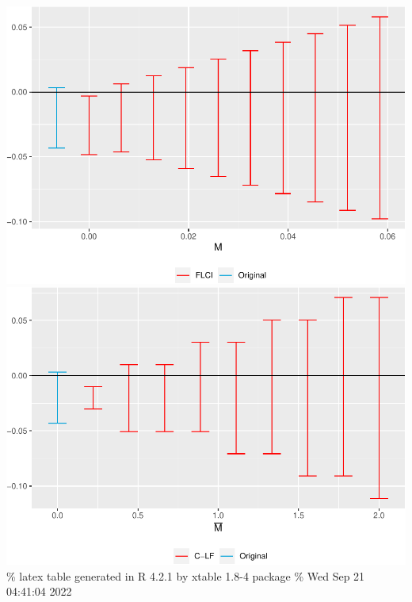 \documentclass[
]{article}
\begin{document}
\includegraphics{Report_files/figure-latex/Figures-9.pdf}
\includegraphics{Report_files/figure-latex/Figures-10.pdf} \% latex
table generated in R 4.2.1 by xtable 1.8-4 package \% Wed Sep 21
04:41:04 2022
\end{document}

